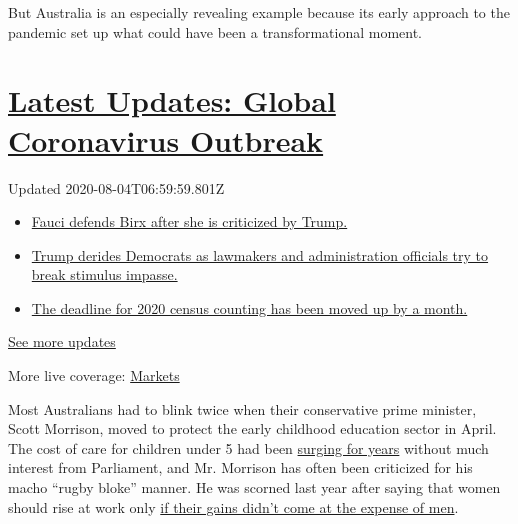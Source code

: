 But Australia is an especially revealing example because its early
approach to the pandemic set up what could have been a transformational
moment.

\hypertarget{latest-updates-global-coronavirus-outbreak}{%
\section{\texorpdfstring{\href{https://www.nytimes.com/2020/08/03/world/coronavirus-covid-19.html?action=click\&pgtype=Article\&state=default\&region=MAIN_CONTENT_1\&context=storylines_live_updates}{Latest
Updates: Global Coronavirus
Outbreak}}{Latest Updates: Global Coronavirus Outbreak}}\label{latest-updates-global-coronavirus-outbreak}}

Updated 2020-08-04T06:59:59.801Z

\begin{itemize}
\tightlist
\item
  \href{https://www.nytimes.com/2020/08/03/world/coronavirus-covid-19.html?action=click\&pgtype=Article\&state=default\&region=MAIN_CONTENT_1\&context=storylines_live_updates\#link-4547638f}{Fauci
  defends Birx after she is criticized by Trump.}
\item
  \href{https://www.nytimes.com/2020/08/03/world/coronavirus-covid-19.html?action=click\&pgtype=Article\&state=default\&region=MAIN_CONTENT_1\&context=storylines_live_updates\#link-15e7f995}{Trump
  derides Democrats as lawmakers and administration officials try to
  break stimulus impasse.}
\item
  \href{https://www.nytimes.com/2020/08/03/world/coronavirus-covid-19.html?action=click\&pgtype=Article\&state=default\&region=MAIN_CONTENT_1\&context=storylines_live_updates\#link-e5a2cda}{The
  deadline for 2020 census counting has been moved up by a month.}
\end{itemize}

\href{https://www.nytimes.com/2020/08/03/world/coronavirus-covid-19.html?action=click\&pgtype=Article\&state=default\&region=MAIN_CONTENT_1\&context=storylines_live_updates}{See
more updates}

More live coverage:
\href{https://www.nytimes.com/live/2020/08/03/business/stock-market-today-coronavirus?action=click\&pgtype=Article\&state=default\&region=MAIN_CONTENT_1\&context=storylines_live_updates}{Markets}

Most Australians had to blink twice when their conservative prime
minister, Scott Morrison, moved to protect the early childhood education
sector in April. The cost of care for children under 5 had been
\href{https://www.abs.gov.au/ausstats/abs@.nsf/cat/4402.0}{surging for
years} without much interest from Parliament, and Mr. Morrison has often
been criticized for his macho ``rugby bloke'' manner. He was scorned
last year after saying that women should rise at work only
\href{https://www.sbs.com.au/news/scott-morrison-says-the-rise-of-women-should-not-come-at-the-expense-of-men}{if
their gains didn't come at the expense of men}.

